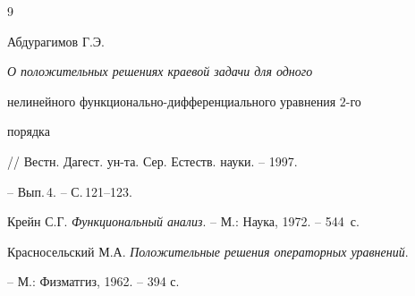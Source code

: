 \begin{thebibliography}{9} 


 




Абдурагимов Г.Э. {\em О положительных решениях краевой задачи для одного 


нелинейного функционально-дифференциального уравнения $2$-го 


порядка} // Вестн. Дагест. ун-та. Сер. Естеств. науки. -- 1997. 


-- Вып.\,4. -- С.\,121--123. 




Крейн С.Г. {\em Функциональный анализ}. -- М.: Наука, 1972. -- 544~с. 




Красносельский М.А. {\em Положительные решения операторных уравнений}. 


-- М.: Физматгиз, 1962. -- 394 с. 


 


\end{thebibliography} 


 


\vskip 2cm 


 








 


\label{end} 


 


